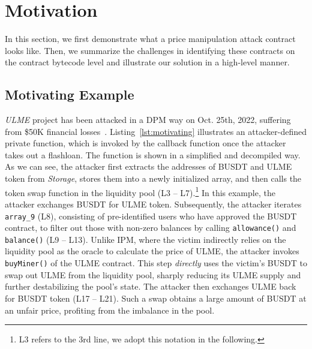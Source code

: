 \section{Motivation}
\label{sec:acb}

In this section, we first demonstrate what a price manipulation attack contract looks like. Then, we summarize the challenges in identifying these contracts on the contract bytecode level and illustrate our solution in a high-level manner.


\subsection{Motivating Example}
\label{sec:moti_eg}
\textit{ULME} project has been attacked in a DPM way on Oct. 25th, 2022, suffering from \$50K financial losses~\cite{ulme}. Listing~\ref{lst:motivating} illustrates an attacker-defined private function, which is invoked by the callback function once the attacker takes out a flashloan. The function is shown in a simplified and decompiled way.
As we can see, the attacker first extracts the addresses of BUSDT and ULME token from \textit{Storage}, stores them into a newly initialized array, and then calls the token swap function in the liquidity pool (L3 -- L7).\footnote{L3 refers to the 3rd line, we adopt this notation in the following.}
In this example, the attacker exchanges BUSDT for ULME token. Subsequently, the attacker iterates \texttt{array\_9} (L8), consisting of pre-identified users who have approved the BUSDT contract, to filter out those with non-zero balances by calling \texttt{allowance()} and \texttt{balance()} (L9 -- L13).
Unlike IPM, where the victim indirectly relies on the liquidity pool as the oracle to calculate the price of ULME, the attacker invokes \texttt{buyMiner()} of the ULME contract. This step \textit{directly} uses the victim's BUSDT to swap out ULME from the liquidity pool, sharply reducing its ULME supply and further destabilizing the pool's state.
The attacker then exchanges ULME back for BUSDT token (L17 -- L21). Such a swap obtains a large amount of BUSDT at an unfair price, profiting from the imbalance in the pool.


